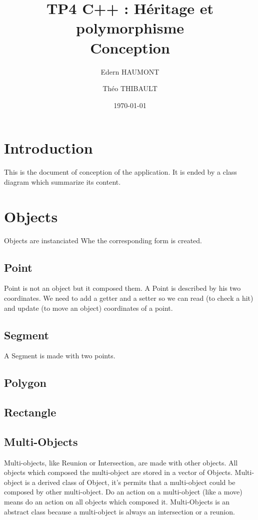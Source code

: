 \documentclass[a4paper, 12pts]{article}
\title{TP4 C++ : Héritage et polymorphisme \\
    \large Conception}
\author{Edern HAUMONT}
\author{Théo THIBAULT}
\affil{B3133}
\date{\today}
\begin{document}

\maketitle



\section{Introduction}
	This is the document of conception of the application. It is ended by a class diagram which summarize its content.

\section{Objects}
    Objects are instanciated Whe the corresponding form is created.
    \subsection{Point}
        Point is not an object but it composed them. A Point is described by his two coordinates. We need to add a getter and
        a setter so we can read (to check a hit) and update (to move an object) coordinates of a point.
    \subsection{Segment}
        A Segment is made with two points.
    \subsection{Polygon}
    \subsection{Rectangle}
    \subsection{Multi-Objects}
        Multi-objects, like Reunion or Intersection, are made with other objects. All objects which composed the multi-object are
        stored in a vector of Objects. Multi-object is a derived class of Object, it's permits that a multi-object could be composed
        by other multi-object. Do an action on a multi-object (like a move) means do an action on all objects which composed it.
        Multi-Objects is an abstract class because a multi-object is always an intersection or a reunion.
\end{document}
